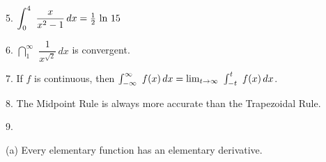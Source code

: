 \documentclass{sebase}
\begin{document}
\begin{multicols}{2}
\begin{ExerciseList}
%

\item[\hfill 5.] $\dint\nolimits_{0}^{4}\,\,\dfrac{x}{x^{2}-1}\,dx=\tfrac{1}{%
2}\,\ln \,15$

%

%

\item[\hfill 6.] $\dint\nolimits_{1}^{\infty }\,\,\dfrac{1}{x^{\sqrt{2}}}%
\,dx $ is convergent.

%

\item[\hfill 7.] If $f$ is continuous, then $\textstyle \int_{-\infty }^{\infty
}\,\,f(x)\,dx=\lim\nolimits_{t\rightarrow \infty
}\,\,\textstyle \int_{-t}^{t}\,\,f(x)\,dx$.

%

%

\item[\hfill 8.] The Midpoint Rule is always more accurate than the \newline
Trapezoidal Rule.

%

\item[\hfill 9.] 

\begin{ExerciseList}
\item[(a)] Every elementary function has an elementary derivative.


\end{ExerciseList}
\end{ExerciseList}
\end{multicols}
\end{document}
